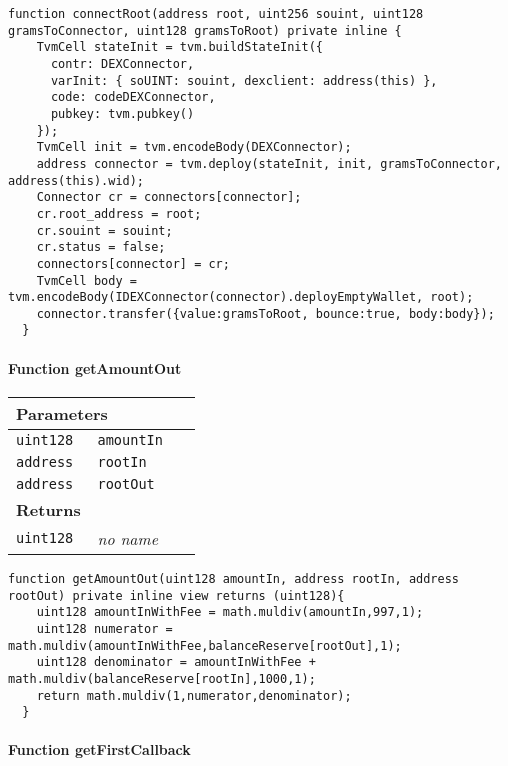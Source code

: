 \vspace{2cm}

\begin{lstlisting}[firstnumber=113]
  function connectRoot(address root, uint256 souint, uint128 gramsToConnector, uint128 gramsToRoot) private inline {
    TvmCell stateInit = tvm.buildStateInit({
      contr: DEXConnector,
      varInit: { soUINT: souint, dexclient: address(this) },
      code: codeDEXConnector,
      pubkey: tvm.pubkey()
    });
    TvmCell init = tvm.encodeBody(DEXConnector);
    address connector = tvm.deploy(stateInit, init, gramsToConnector, address(this).wid);
    Connector cr = connectors[connector];
    cr.root_address = root;
    cr.souint = souint;
    cr.status = false;
    connectors[connector] = cr;
    TvmCell body = tvm.encodeBody(IDEXConnector(connector).deployEmptyWallet, root);
    connector.transfer({value:gramsToRoot, bounce:true, body:body});
  }
\end{lstlisting}

\paragraph{Function getAmountOut}


\ifsoltables
\noindent\begin{tabular}{|l|l|p{5cm}|}\hline
\multicolumn{3}{|l|}{\bf Parameters}\\\hline
\tt uint128 & \tt amountIn &\\\hline
\tt address & \tt rootIn &\\\hline
\tt address & \tt rootOut &\\\hline
\multicolumn{3}{|l|}{\bf Returns}\\\hline
\tt uint128 & {\em no name} &\\\hline
\end{tabular}
\fi

\vspace{2cm}

\begin{lstlisting}[firstnumber=157]
  function getAmountOut(uint128 amountIn, address rootIn, address rootOut) private inline view returns (uint128){
    uint128 amountInWithFee = math.muldiv(amountIn,997,1);
    uint128 numerator = math.muldiv(amountInWithFee,balanceReserve[rootOut],1);
    uint128 denominator = amountInWithFee + math.muldiv(balanceReserve[rootIn],1000,1);
    return math.muldiv(1,numerator,denominator);
  }
\end{lstlisting}

\paragraph{Function getFirstCallback}


